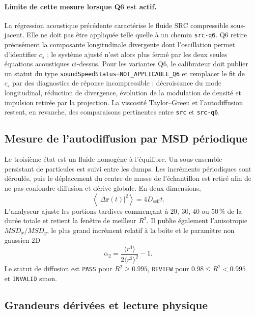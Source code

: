 \documentclass[11pt,a4paper]{article}
\begin{document}
\paragraph{Limite de cette mesure lorsque Q6 est actif.}
La régression acoustique précédente caractérise le fluide SRC compressible sous-jacent. Elle ne doit pas être appliquée telle quelle à un chemin \texttt{src-q6}. Q6 retire précisément la composante longitudinale divergente dont l'oscillation permet d'identifier $c_s$ ; le système ajusté n'est alors plus fermé par les deux seules équations acoustiques ci-dessus. Pour les variantes Q6, le calibrateur doit publier un statut du type \texttt{soundSpeedStatus=NOT\_APPLICABLE\_Q6} et remplacer le fit de $c_s$ par des diagnostics de réponse incompressible : décroissance du mode longitudinal, réduction de divergence, évolution de la modulation de densité et impulsion retirée par la projection. La viscosité Taylor--Green et l'autodiffusion restent, en revanche, des comparaisons pertinentes entre \texttt{src} et \texttt{src-q6}.


\subsection{Mesure de l'autodiffusion par MSD périodique}

Le troisième état est un fluide homogène à l'équilibre. Un sous-ensemble persistant de particules est suivi entre les dumps. Les incréments périodiques sont déroulés, puis le déplacement du centre de masse de l'échantillon est retiré afin de ne pas confondre diffusion et dérive globale. En deux dimensions,
\begin{equation}
  \left\langle|\Delta\bm r(t)|^2\right\rangle=4D_{\mathrm{self}}t.
\end{equation}
L'analyseur ajuste les portions tardives commençant à $20$, $30$, $40$ ou $50\,\%$ de la durée totale et retient la fenêtre de meilleur $R^2$. Il publie également l'anisotropie $MSD_x/MSD_y$, le plus grand incrément relatif à la boîte et le paramètre non gaussien 2D
\begin{equation}
  \alpha_2=\frac{\langle r^4\rangle}{2\langle r^2\rangle^2}-1.
\end{equation}
Le statut de diffusion est \texttt{PASS} pour $R^2\geq0.995$, \texttt{REVIEW} pour $0.98\leq R^2<0.995$ et \texttt{INVALID} sinon.

\subsection{Grandeurs dérivées et lecture physique}
\end{document}
